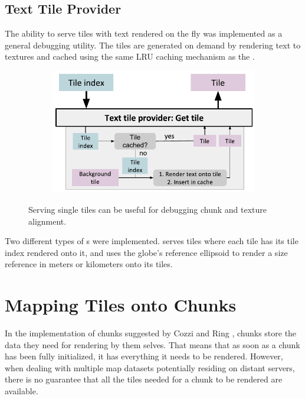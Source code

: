 \subsection{Text Tile Provider}
The ability to serve tiles with text rendered on the fly was implemented as a general debugging utility. The tiles are generated on demand by rendering text to textures and cached using the same LRU caching mechanism as the .

\begin{figure}[htbp]
    \centering
    \begin{subfigure}[bt]{0.6\textwidth}
        \includegraphics[width=\textwidth]{figures/implementation/tileprovider/texttileprovider_gettile.pdf}
    \end{subfigure}
    \caption{Serving single tiles can be useful for debugging chunk and texture alignment.}
    \label{fig:texttileprovider_gettile}
\end{figure}

Two different types of s were implemented.  serves tiles where each tile has its tile index rendered onto it, and  uses the globe's reference ellipsoid to render a size reference in meters or kilometers onto its tiles.


\section{Mapping Tiles onto Chunks}
  
In the implementation of chunks suggested by Cozzi and Ring \cite{cozzi11}, chunks store the data they need for rendering by them selves. That means that as soon as a chunk has been fully initialized, it has everything it needs to be rendered. However, when dealing with multiple map datasets potentially residing on distant servers, there is no guarantee that all the tiles needed for a chunk to be rendered are available.

